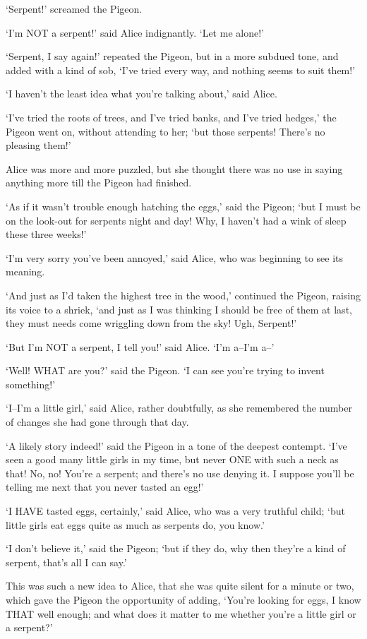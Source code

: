 \documentclass[12pt]{book}
\begin{document}
  `Serpent!' screamed the Pigeon.

  `I'm NOT a serpent!' said Alice indignantly.  `Let me alone!'

  `Serpent, I say again!' repeated the Pigeon, but in a more
subdued tone, and added with a kind of sob, `I've tried every
way, and nothing seems to suit them!'

  `I haven't the least idea what you're talking about,' said
Alice.

  `I've tried the roots of trees, and I've tried banks, and I've
tried hedges,' the Pigeon went on, without attending to her; `but
those serpents!  There's no pleasing them!'

  Alice was more and more puzzled, but she thought there was no
use in saying anything more till the Pigeon had finished.

  `As if it wasn't trouble enough hatching the eggs,' said the
Pigeon; `but I must be on the look-out for serpents night and
day!  Why, I haven't had a wink of sleep these three weeks!'

  `I'm very sorry you've been annoyed,' said Alice, who was
beginning to see its meaning.

  `And just as I'd taken the highest tree in the wood,' continued
the Pigeon, raising its voice to a shriek, `and just as I was
thinking I should be free of them at last, they must needs come
wriggling down from the sky!  Ugh, Serpent!'

  `But I'm NOT a serpent, I tell you!' said Alice.  `I'm a--I'm
a--'

  `Well!  WHAT are you?' said the Pigeon.  `I can see you're
trying to invent something!'

  `I--I'm a little girl,' said Alice, rather doubtfully, as she
remembered the number of changes she had gone through that day.

  `A likely story indeed!' said the Pigeon in a tone of the
deepest contempt.  `I've seen a good many little girls in my
time, but never ONE with such a neck as that!  No, no!  You're a
serpent; and there's no use denying it.  I suppose you'll be
telling me next that you never tasted an egg!'

  `I HAVE tasted eggs, certainly,' said Alice, who was a very
truthful child; `but little girls eat eggs quite as much as
serpents do, you know.'

  `I don't believe it,' said the Pigeon; `but if they do, why
then they're a kind of serpent, that's all I can say.'

  This was such a new idea to Alice, that she was quite silent
for a minute or two, which gave the Pigeon the opportunity of
adding, `You're looking for eggs, I know THAT well enough; and
what does it matter to me whether you're a little girl or a
serpent?'
\end{document}
